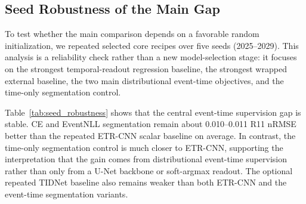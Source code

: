 \documentclass[12pt]{article}
\begin{document}
\subsection{Seed Robustness of the Main Gap}

To test whether the main comparison depends on a favorable random initialization, we repeated selected core recipes over five seeds (2025--2029). This analysis is a reliability check rather than a new model-selection stage: it focuses on the strongest temporal-readout regression baseline, the strongest wrapped external baseline, the two main distributional event-time objectives, and the time-only segmentation control.

Table~\ref{tab:seed_robustness} shows that the central event-time supervision gap is stable. CE and EventNLL segmentation remain about 0.010--0.011 R11 nRMSE better than the repeated ETR-CNN scalar baseline on average. In contrast, the time-only segmentation control is much closer to ETR-CNN, supporting the interpretation that the gain comes from distributional event-time supervision rather than only from a U-Net backbone or soft-argmax readout. The optional repeated TIDNet baseline also remains weaker than both ETR-CNN and the event-time segmentation variants.

\begin{table}[!t]
\centering
\caption{Five-seed robustness summary for selected core models. Values are mean $\pm$ sample standard deviation over seeds 2025--2029; R11 range is min--max across seeds. Posterior scores are reported only for event-time segmentation runs. Lower is better for all metrics.}
\label{tab:seed_robustness}
\scriptsize
\setlength{\tabcolsep}{3pt}
\renewcommand{\arraystretch}{1.12}
\end{table}
\end{document}
